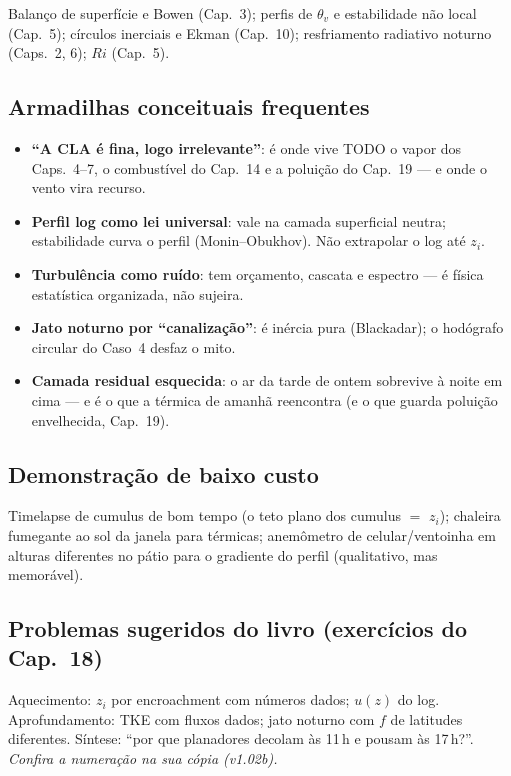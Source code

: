 Balanço de superfície e Bowen (Cap.~3); perfis de $\theta_v$ e
estabilidade não local (Cap.~5); círculos inerciais e Ekman
(Cap.~10); resfriamento radiativo noturno (Caps.~2, 6); $Ri$
(Cap.~5).

\subsection*{Armadilhas conceituais frequentes}

\begin{itemize}
  \item \textbf{``A CLA é fina, logo irrelevante''}: é onde vive TODO
        o vapor dos Caps.~4--7, o combustível do Cap.~14 e a poluição
        do Cap.~19 — e onde o vento vira recurso.
  \item \textbf{Perfil log como lei universal}: vale na camada
        superficial neutra; estabilidade curva o perfil
        (Monin--Obukhov). Não extrapolar o log até $z_i$.
  \item \textbf{Turbulência como ruído}: tem orçamento, cascata e
        espectro — é física estatística organizada, não sujeira.
  \item \textbf{Jato noturno por ``canalização''}: é inércia pura
        (Blackadar); o hodógrafo circular do Caso~4 desfaz o mito.
  \item \textbf{Camada residual esquecida}: o ar da tarde de ontem
        sobrevive à noite em cima — e é o que a térmica de amanhã
        reencontra (e o que guarda poluição envelhecida, Cap.~19).
\end{itemize}

\subsection*{Demonstração de baixo custo}

Timelapse de cumulus de bom tempo (o teto plano dos cumulus $=$
$z_i$); chaleira fumegante ao sol da janela para térmicas;
anemômetro de celular/ventoinha em alturas diferentes no pátio para o
gradiente do perfil (qualitativo, mas memorável).

\subsection*{Problemas sugeridos do livro (exercícios do Cap.~18)}

Aquecimento: $z_i$ por encroachment com números dados; $u(z)$ do log.
Aprofundamento: TKE com fluxos dados; jato noturno com $f$ de
latitudes diferentes. Síntese: ``por que planadores decolam às 11\,h
e pousam às 17\,h?''. \emph{Confira a numeração na sua cópia
(v1.02b).}

